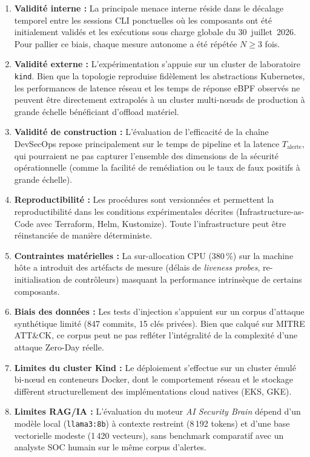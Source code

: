 \begin{enumerate}
    \item \textbf{Validité interne :} La principale menace interne réside dans le décalage temporel entre les sessions CLI ponctuelles où les composants ont été initialement validés et les exécutions sous charge globale du 30~juillet~2026. Pour pallier ce biais, chaque mesure autonome a été répétée $N \ge 3$ fois.
    \item \textbf{Validité externe :} L'expérimentation s'appuie sur un cluster de laboratoire \texttt{kind}. Bien que la topologie reproduise fidèlement les abstractions Kubernetes, les performances de latence réseau et les temps de réponse eBPF observés ne peuvent être directement extrapolés à un cluster multi-nœuds de production à grande échelle bénéficiant d'offload matériel.
    \item \textbf{Validité de construction :} L'évaluation de l'efficacité de la chaîne DevSecOps repose principalement sur le temps de pipeline et la latence $T_{\text{alerte}}$, qui pourraient ne pas capturer l'ensemble des dimensions de la sécurité opérationnelle (comme la facilité de remédiation ou le taux de faux positifs à grande échelle).
    \item \textbf{Reproductibilité :} Les procédures sont versionnées et permettent la reproductibilité dans les conditions expérimentales décrites (Infrastructure-as-Code avec Terraform, Helm, Kustomize). Toute l'infrastructure peut être réinstanciée de manière déterministe.
    \item \textbf{Contraintes matérielles :} La sur-allocation CPU ($380\,\%$) sur la machine hôte a introduit des artéfacts de mesure (délais de \textit{liveness probes}, re-initialisation de contrôleurs) masquant la performance intrinsèque de certains composants.
    \item \textbf{Biais des données :} Les tests d'injection s'appuient sur un corpus d'attaque synthétique limité (847 commits, 15 clés privées). Bien que calqué sur MITRE ATT\&CK, ce corpus peut ne pas refléter l'intégralité de la complexité d'une attaque Zero-Day réelle.
    \item \textbf{Limites du cluster Kind :} Le déploiement s'effectue sur un cluster émulé bi-nœud en conteneurs Docker, dont le comportement réseau et le stockage diffèrent structurellement des implémentations cloud natives (EKS, GKE).
    \item \textbf{Limites RAG/IA :} L'évaluation du moteur \textit{AI Security Brain} dépend d'un modèle local (\texttt{llama3:8b}) à contexte restreint (8\,192 tokens) et d'une base vectorielle modeste (1\,420 vecteurs), sans benchmark comparatif avec un analyste SOC humain sur le même corpus d'alertes.
\end{enumerate}

